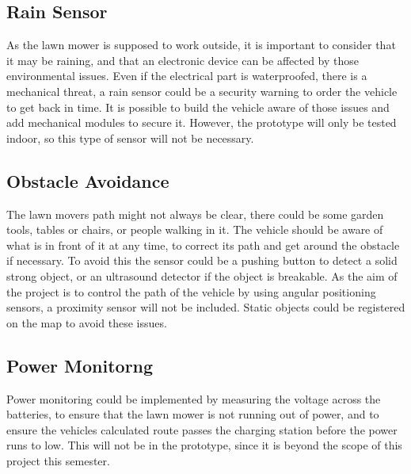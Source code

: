 \subsection{Rain Sensor}
As the lawn mower is supposed to work outside, it is important to consider that it may be raining, and that an electronic device can be affected by those environmental issues. Even if the electrical part is waterproofed, there is a mechanical threat, a rain sensor could be a security warning to order the vehicle to get back in time.
It is possible to build the vehicle aware of those issues and add mechanical modules to secure it. However, the prototype will only be tested indoor, so this type of sensor will not be necessary.

\subsection{Obstacle Avoidance}
The lawn movers path might not always be clear, there could be some garden tools, tables or chairs, or people walking in it. The vehicle should be aware of what is in front of it at any time, to correct its path and get around the obstacle if necessary. To avoid this the sensor could be a pushing button to detect a solid strong object, or an ultrasound detector if the object is breakable.
As the aim of the project is to control the path of the vehicle by using angular positioning sensors, a proximity sensor will not be included. Static objects could be registered on the map to avoid these issues.

\subsection{Power Monitorng}
Power monitoring could be implemented by measuring the voltage across the batteries, to ensure that the lawn mower is not running out of power, and to ensure the vehicles calculated route passes the charging station before the power runs to low. 
This will not be in the prototype, since it is beyond the scope of this project this semester.

